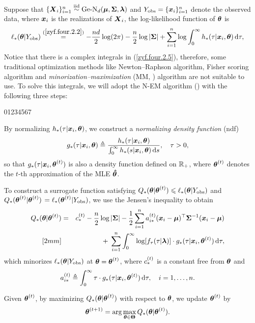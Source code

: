 Suppose that $\{{\boldsymbol{X}}_i\}_{i=1}^n \stackrel{{\rm iid}}{\sim} \mbox{Ge-N}_d({\boldsymbol{\mu}}, {\mbox{\boldmath$\Sigma$}}, {\boldsymbol{\lambda}})$ and $Y_{\rm obs} = \{{\boldsymbol{x}}_i\}_{i=1}^n$ denote the observed data, where ${\boldsymbol{x}}_i$ is the realizations of ${\boldsymbol{X}}_i$, the log-likelihood function of ${\boldsymbol{\theta}}$ is
\begin{eqnarray}    \label{zyf.four.2.5}
    \ell_*({\boldsymbol{\theta}} | Y_{\rm obs}) \stackrel{(\ref{zyf.four.2.2})}{=} -\frac{nd}{2} \log(2\pi) - \frac{n}{2} \log|{\mbox{\boldmath$\Sigma$}}| + \sum_{i=1}^n \log \int_0^\infty h_*(\tau | {\boldsymbol{x}}_i, {\boldsymbol{\theta}}) \,\mbox{d} \tau,
\end{eqnarray}
Notice that there is a complex integrals in (\ref{zyf.four.2.5}), therefore, some traditional optimization methods like Newton--Raphson algorithm, Fisher scoring algorithm and \textit{minorization--maximization} (MM, \cite{HL2004}) algorithm are not suitable to use. To solve this integrals, we will adopt the N-EM algorithm (\cite{TL2022}) with the following three steps:
\begin{namelist}{01234567}
\item[\hspace*{-0.08cm} \textsf{N-step}:] By normalizing $h_*(\tau | {\boldsymbol{x}}_i, {\boldsymbol{\theta}})$, we construct a \textit{normalizing density function} (ndf)
	$$
       g_*(\tau | {\boldsymbol{x}}_i, {\boldsymbol{\theta}}) \triangleq \frac{h_*(\tau | {\boldsymbol{x}}_i, {\boldsymbol{\theta}})}{\int_0^\infty h_*(s | {\boldsymbol{x}}_i, {\boldsymbol{\theta}}) \,\mbox{d} s}, \quad \tau > 0,
	$$
    so that $g_*(\tau | {\boldsymbol{x}}_i, {\boldsymbol{\theta}}^{(t)})$ is also a density function defined on ${\mathbb{R}}_+$, where ${\boldsymbol{\theta}}^{(t)}$ denotes the $t$-th approximation of the MLE $\boldsymbol{\hat{\theta}}$.

\item[\hspace*{-0.08cm} \textsf{E-step}:] To construct a surrogate function satisfying $Q_*({\boldsymbol{\theta}} | {\boldsymbol{\theta}}^{(t)}) \leqslant \ell_*({\boldsymbol{\theta}} | Y_{\rm obs})$ and $Q_*({\boldsymbol{\theta}}^{(t)} | {\boldsymbol{\theta}}^{(t)})$ $=\ell_*({\boldsymbol{\theta}}^{(t)} | Y_{\rm obs})$, we use the Jensen's inequality to obtain
	\begin{eqnarray}   \label{zyf.four.2.6}
        Q_*({\boldsymbol{\theta}} | {\boldsymbol{\theta}}^{(t)}) &=& c^{(t)}_{*} - \frac{n}{2} \log|{\mbox{\boldmath$\Sigma$}}| - \frac{1}{2} \sum_{i=1}^n a^{(t)}_{i*} ({\boldsymbol{x}}_i - {\boldsymbol{\mu}})^\top {\mbox{\boldmath$\Sigma$}}^{-1} ({\boldsymbol{x}}_i - {\boldsymbol{\mu}}) \nonumber \\ [2mm]
        && +\; \sum_{i=1}^n \int_0^\infty \log[f_\tau(\tau | {\boldsymbol{\lambda}})] \cdot g_*(\tau | {\boldsymbol{x}}_i, {\boldsymbol{\theta}}^{(t)}) \,\mbox{d} \tau,
	\end{eqnarray}
    which minorizes $\ell_*({\boldsymbol{\theta}} | Y_{\rm obs})$ at ${\boldsymbol{\theta}} = {\boldsymbol{\theta}}^{(t)}$, where $c^{(t)}_{*}$ is a constant free from ${\boldsymbol{\theta}}$ and
    \begin{eqnarray}    \label{zyf.four.2.7}
        a^{(t)}_{i*} \triangleq \int_0^\infty \tau \cdot g_*(\tau | {\boldsymbol{x}}_i, {\boldsymbol{\theta}}^{(t)}) \,\mbox{d} \tau, \quad i = 1, \dots, n.
    \end{eqnarray}
	
\item[\hspace*{-0.08cm} \textsf{M-step}:] Given ${\boldsymbol{\theta}}^{(t)}$, by maximizing $Q_*({\boldsymbol{\theta}} | {\boldsymbol{\theta}}^{(t)})$ with respect to ${\boldsymbol{\theta}}$, we update ${\boldsymbol{\theta}}^{(t)}$ by
	$$
	   {\boldsymbol{\theta}}^{(t+1)} = \arg \max_{{\boldsymbol{\theta}}\in{\boldsymbol{\Theta}}} Q_*({\boldsymbol{\theta}} | {\boldsymbol{\theta}}^{(t)}).
	$$
\end{namelist}
